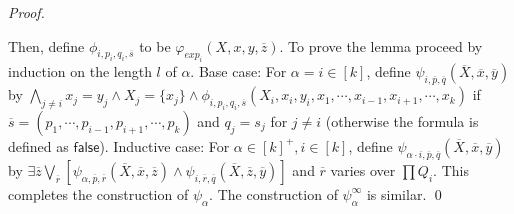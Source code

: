 \documentclass{llncs}
\newcommand{\tup}[1]{\overline{#1}}
\def\false{\textsf{false}}
\begin{document}
\begin{proof}
\begin{itemize}
\end{itemize}

Then, define $\phi_{i,p_i,q_i,\tup{s}}$ to be $\varphi_{exp_i}(X,x,y,\tup{z})$.
%
%
%
To prove the lemma proceed by induction on the length $l$ of $\alpha$.
%
Base case: For $\alpha = i \in [k]$, define $\psi_{i,\tup{p},\tup{q}}(\tup{X},\tup{x},\tup{y})$ by
$
\bigwedge_{j \neq i} x_j = y_j \wedge X_j = \{x_j\}
\wedge \phi_{i,p_i,q_i,\tup{s}}(X_i,x_i,y_i,x_1, \cdots, x_{i-1}, x_{i+1}, \cdots, x_k)
$
if $\tup{s} = (p_1, \cdots, p_{i-1}, p_{i+1}, \cdots, p_k)$ and $q_j = s_j$ for $j \neq i$ (otherwise the formula is defined as $\false$).
%
Inductive case: For $\alpha \in [k]^+, i \in [k]$, define $\psi_{\alpha \cdot i,\tup{p},\tup{q}}(\tup{X},\tup{x},\tup{y})$ by
$
 \exists \tup{z}  \bigvee_{\tup{r}} \left[ \psi_{\alpha,\tup{p},\tup{r}}(\tup{X},\tup{x},\tup{z}) \wedge \psi_{i,\tup{r},\tup{q}} (\tup{X},\tup{z},\tup{y})\right]
$
 and $\tup{r}$ varies over $\prod Q_i$.
This completes the construction of $\psi_\alpha$.  The construction of $\psi^\infty_\alpha$ is similar.
\qed
\end{proof}
\end{document}

